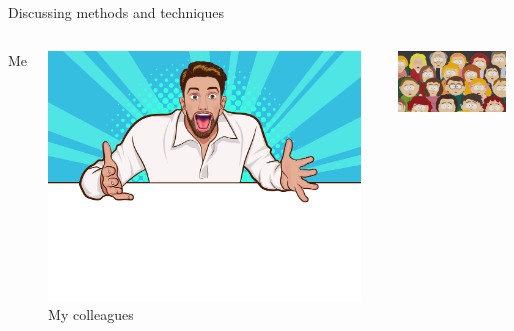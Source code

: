 \documentclass[10pt]{beamer}
\begin{document}
\begin{frame}[fragile]{Discussing methods and techniques}  
\begin{columns}[T,onlytextwidth]
        \centering
        Me
        
        \includegraphics[width=0.95\textwidth]{excited}
        \centering
        My colleagues
        
        \includegraphics[width=0.95\textwidth]{confused}

\end{columns}


\end{frame}
\end{document}
